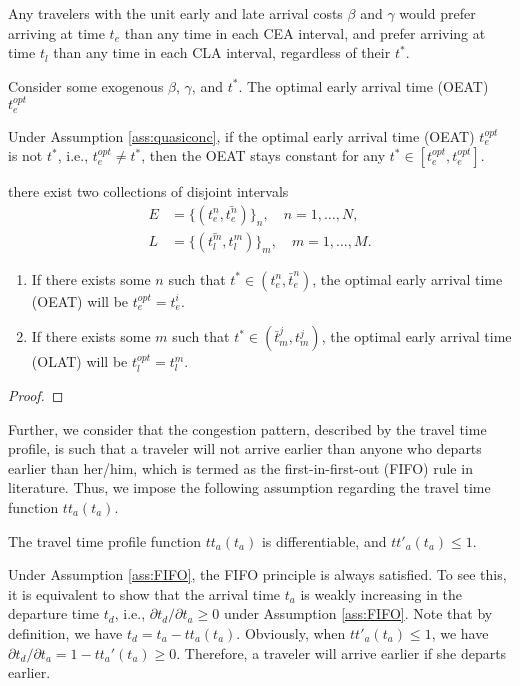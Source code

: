 Any travelers with the unit early and late arrival costs $\beta$ and $\gamma$ would prefer arriving at time $t_e$ than any time in each CEA interval, and prefer arriving at time $t_l$ than any time in each CLA interval, regardless of their $t^*$. 


\begin{prop}
  \label{prop:into-early-late}
Consider some exogenous  \(\beta\), \( \gamma\), and $t^*$. The optimal early arrival time (OEAT) $t_e^{opt}$ 


Under Assumption \ref{ass:quasiconc}, if the optimal early arrival time (OEAT) $t_e^{opt}$ is not $t^*$, i.e., $t_e^{opt} \neq t^*$,  then the OEAT stays constant for any $t^* \in [t_e^{opt}, t_e^{opt}]$.


there exist two collections of disjoint intervals
  \begin{align*}
    E & = \{(t_e^n, \bar{t_e^n})\}_n,\quad n = 1, \dots, N, \\
    L & = \{(\bar{t_l^m}, t_l^m)\}_m,\quad m = 1, \dots, M.
  \end{align*}
  \begin{enumerate}
      \item If there exists some \(n\) such that \(t^* \in (t_e^n, \bar{t}_e^n)\), the optimal early arrival time (OEAT) will be $t_e^{opt} = t_e^i$. 
      \item If there exists some \(m\) such that \(t^* \in (\bar{t}_m^j, t_m^j)\), the optimal early arrival time (OLAT) will be $t_l^{opt} = t_l^{m}$.
  \end{enumerate}

\end{prop}
\begin{proof}

\end{proof}

Further, we consider that the congestion pattern, described by the travel time profile, is such that a traveler will not arrive earlier than anyone who departs earlier than her/him, which is termed as the first-in-first-out (FIFO) rule in literature. Thus, we impose the following assumption regarding the travel time function  $tt_a(t_a)$.



\begin{assumption}\label{ass:FIFO}
The travel time profile function $tt_a(t_a)$ is differentiable, and $tt'_a(t_a) \le 1$. 
\end{assumption}


Under Assumption \ref{ass:FIFO}, the FIFO principle is always satisfied. To see this, it is equivalent to show that the arrival time $t_a$ is weakly increasing in the departure time $t_d$, i.e., $\partial t_d / \partial t_a \ge 0$ under Assumption \ref{ass:FIFO}.  Note that by definition, we have $ t_d = t_a - tt_a(t_a)  $.  Obviously, when $tt'_a(t_a) \le 1$, we have $\partial t_d / \partial t_a = 1 - tt_a'(t_a) \ge 0$. Therefore, a traveler will arrive earlier if she departs earlier. 



